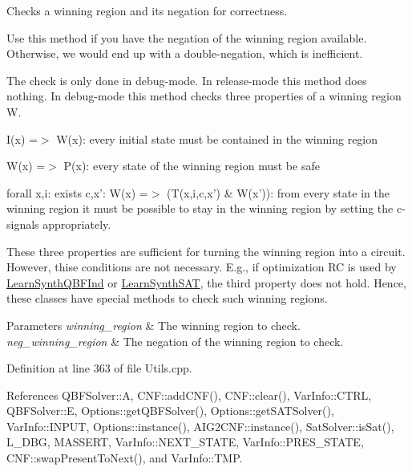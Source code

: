 Checks a winning region and its negation for correctness. 

Use this method if you have the negation of the winning region available. Otherwise, we would end up with a double-\/negation, which is inefficient.

The check is only done in debug-\/mode. In release-\/mode this method does nothing. In debug-\/mode this method checks three properties of a winning region W. 
\begin{DoxyEnumerate}
\item I(x) =$>$ W(x)\-: every initial state must be contained in the winning region 
\item W(x) =$>$ P(x)\-: every state of the winning region must be safe 
\item forall x,i\-: exists c,x'\-: W(x) =$>$ (T(x,i,c,x') \& W(x'))\-: from every state in the winning region it must be possible to stay in the winning region by setting the c-\/signals appropriately. 
\end{DoxyEnumerate}These three properties are sufficient for turning the winning region into a circuit. However, thise conditions are not necessary. E.\-g., if optimization R\-C is used by \hyperlink{classLearnSynthQBFInd}{Learn\-Synth\-Q\-B\-F\-Ind} or \hyperlink{classLearnSynthSAT}{Learn\-Synth\-S\-A\-T}, the third property does not hold. Hence, these classes have special methods to check such winning regions.


\begin{DoxyParams}{Parameters}
{\em winning\-\_\-region} & The winning region to check. \\
\hline
{\em neg\-\_\-winning\-\_\-region} & The negation of the winning region to check. \\
\hline
\end{DoxyParams}


Definition at line 363 of file Utils.\-cpp.



References Q\-B\-F\-Solver\-::\-A, C\-N\-F\-::add\-C\-N\-F(), C\-N\-F\-::clear(), Var\-Info\-::\-C\-T\-R\-L, Q\-B\-F\-Solver\-::\-E, Options\-::get\-Q\-B\-F\-Solver(), Options\-::get\-S\-A\-T\-Solver(), Var\-Info\-::\-I\-N\-P\-U\-T, Options\-::instance(), A\-I\-G2\-C\-N\-F\-::instance(), Sat\-Solver\-::is\-Sat(), L\-\_\-\-D\-B\-G, M\-A\-S\-S\-E\-R\-T, Var\-Info\-::\-N\-E\-X\-T\-\_\-\-S\-T\-A\-T\-E, Var\-Info\-::\-P\-R\-E\-S\-\_\-\-S\-T\-A\-T\-E, C\-N\-F\-::swap\-Present\-To\-Next(), and Var\-Info\-::\-T\-M\-P.

